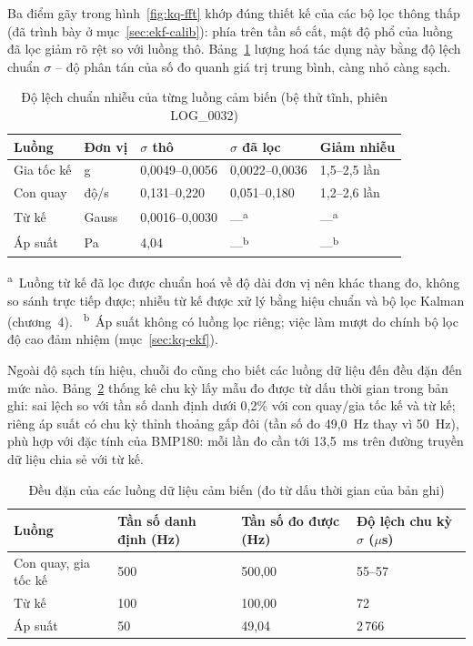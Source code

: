 Ba điểm gãy trong hình~\ref{fig:kq-fft} khớp đúng thiết kế của các bộ lọc thông thấp (đã trình bày ở mục~\ref{sec:ekf-calib}): phía trên tần số cắt, mật độ phổ của luồng đã lọc giảm rõ rệt so với luồng thô. Bảng~\ref{tab:kq-noise} lượng hoá tác dụng này bằng độ lệch chuẩn $\sigma$ -- độ phân tán của số đo quanh giá trị trung bình, càng nhỏ càng sạch.

\begin{table}[h]
\centering
\caption{Độ lệch chuẩn nhiễu của từng luồng cảm biến (bệ thử tĩnh, phiên LOG\_0032)}
\label{tab:kq-noise}
\begin{tabular}{p{3.1cm}p{1.9cm}p{3.2cm}p{3.4cm}p{2.2cm}}
\toprule
Luồng & Đơn vị & $\sigma$ thô & $\sigma$ đã lọc & Giảm nhiễu \\
\midrule
Gia tốc kế & g & 0,0049--0,0056 & 0,0022--0,0036 & 1,5--2,5 lần \\
Con quay & độ/s & 0,131--0,220 & 0,051--0,180 & 1,2--2,6 lần \\
Từ kế & Gauss & 0,0016--0,0030 & ---\textsuperscript{a} & ---\textsuperscript{a} \\
Áp suất & Pa & 4,04 & ---\textsuperscript{b} & ---\textsuperscript{b} \\
\bottomrule
\end{tabular}

{\footnotesize
\textsuperscript{a}~Luồng từ kế đã lọc được chuẩn hoá về độ dài đơn vị nên khác thang đo, không so sánh trực tiếp được; nhiễu từ kế được xử lý bằng hiệu chuẩn và bộ lọc Kalman (chương~4). \
\textsuperscript{b}~Áp suất không có luồng lọc riêng; việc làm mượt do chính bộ lọc độ cao đảm nhiệm (mục~\ref{sec:kq-ekf}).}
\end{table}

Ngoài độ sạch tín hiệu, chuỗi đo cũng cho biết các luồng dữ liệu đến đều đặn đến mức nào. Bảng~\ref{tab:kq-streamjit} thống kê chu kỳ lấy mẫu đo được từ dấu thời gian trong bản ghi: sai lệch so với tần số danh định dưới 0,2\% với con quay/gia tốc kế và từ kế; riêng áp suất có chu kỳ thỉnh thoảng gấp đôi (tần số đo 49,0~Hz thay vì 50~Hz), phù hợp với đặc tính của BMP180: mỗi lần đo cần tới 13,5~ms trên đường truyền dữ liệu chia sẻ với từ kế.

\begin{table}[h]
\centering
\caption{Đều đặn của các luồng dữ liệu cảm biến (đo từ dấu thời gian của bản ghi)}
\label{tab:kq-streamjit}
\setlength{\tabcolsep}{4pt}
\begin{tabular}{p{3.4cm}p{2.4cm}p{2.6cm}p{2.8cm}}
\toprule
Luồng & Tần số danh định (Hz) & Tần số đo được (Hz) & Độ lệch chu kỳ $\sigma$ ($\mu$s) \\
\midrule
Con quay, gia tốc kế & 500 & 500,00 & 55--57 \\
Từ kế & 100 & 100,00 & 72 \\
Áp suất & 50 & 49,04 & 2\,766 \\
\bottomrule
\end{tabular}
\end{table}

